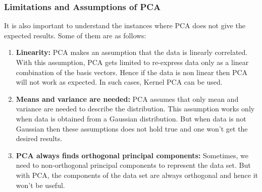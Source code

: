 \subsubsection{Limitations and Assumptions of PCA}
It is also important to understand the instances where PCA does not give the expected results. Some of them are as follows:
\begin{enumerate}
	\item \textbf{Linearity:}
	PCA makes an assumption that the data is linearly correlated. With this assumption, PCA gets limited to re-express data only as a linear combination of the basis vectors. Hence if the data is non linear then PCA will not work as expected. In such cases, Kernel PCA can be used.
	\item \textbf{Means and variance are needed:}
	PCA assumes that only mean and variance are needed to describe the distribution. This assumption works only when data is obtained from a Gaussian distribution. But when data is not Gaussian then these assumptions does not hold true and one won't get the desired results. 
	\item \textbf{PCA always finds orthogonal principal components:}
	Sometimes, we need to non-orthogonal principal components to represent the data set. But with PCA, the components of the data set are always orthogonal and hence it won't be useful.
\end{enumerate}

